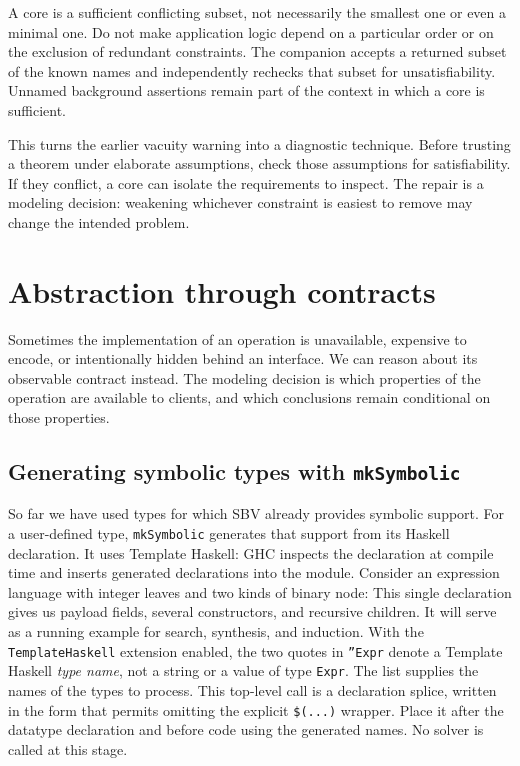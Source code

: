 \documentclass[review]{jfp-epi}
\newcommand{\code}[1]{\texttt{#1}}
\begin{document}
A core is a sufficient conflicting subset, not necessarily the smallest one or
even a minimal one. Do not make application logic depend on a particular order
or on the exclusion of redundant constraints. The companion accepts a returned
subset of the known names and independently rechecks that subset for
unsatisfiability. Unnamed background assertions remain part of the context in
which a core is sufficient.

This turns the earlier vacuity warning into a diagnostic technique. Before
trusting a theorem under elaborate assumptions, check those assumptions for
satisfiability. If they conflict, a core can isolate the requirements to inspect.
The repair is a modeling decision: weakening whichever constraint is easiest
to remove may change the intended problem.


\section{Abstraction through contracts}
\label{sec:abstraction}

Sometimes the implementation of an operation is unavailable, expensive to
encode, or intentionally hidden behind an interface. We can reason about its
observable contract instead. The modeling decision is which properties of the
operation are available to clients, and which conclusions remain conditional
on those properties.


\subsection{Generating symbolic types with \texttt{mkSymbolic}}
\label{sec:mk-symbolic}

So far we have used types for which SBV already provides symbolic support.
For a user-defined type, \code{mkSymbolic} generates that support from its
Haskell declaration. It uses Template Haskell: GHC inspects the declaration at
compile time and inserts generated declarations into the module. Consider an
expression language with integer leaves and two kinds of binary node:
This single declaration gives us payload fields, several constructors, and
recursive children. It will serve as a running example for search, synthesis,
and induction. With the \code{TemplateHaskell} extension enabled, the two quotes
in \code{''Expr} denote a Template Haskell \emph{type name},
not a string or a value of type \code{Expr}. The list supplies the names of the
types to process. This top-level call is a declaration splice, written in the
form that permits omitting the explicit \code{\$(...)} wrapper. Place it after
the datatype declaration and before code using the generated names. No solver
is called at this stage.
\end{document}
